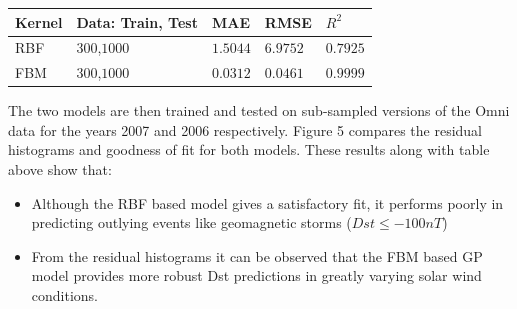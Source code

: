 \documentclass[portrait,a0b,final]{a0poster}
\newenvironment{poster}{
  \begin{center}
  \begin{minipage}[c]{0.85\textwidth}
}{
  \end{minipage} 
  \end{center}
}
\begin{document}
\begin{poster}
\begin{multicols}{2}
\setlength{\arrayrulewidth}{1mm}
\setlength{\tabcolsep}{18pt}
\renewcommand{\arraystretch}{2.5}
{
\begin{tabular}{ |p{5cm}|p{5cm}|p{5cm}|p{5cm}|p{5cm}|  }
\hline
Kernel & Data: Train, Test & MAE & RMSE & $R^2$\\
\hline
RBF  & $300$,$1000$ & $1.5044$ & $6.9752$ & $0.7925$ \\
FBM  & $300$,$1000$ & $0.0312$ & $0.0461$ & $0.9999$ \\
\hline
\end{tabular} 
}
\vspace{\baselineskip}

The two models are then trained and tested on sub-sampled versions of the Omni data for the years 2007 and 2006 respectively. Figure 5 compares the residual histograms and goodness of fit for both models. These results along with table above show that:
\begin{itemize}
    \item Although the RBF based model gives a satisfactory fit, it performs poorly in predicting outlying events like geomagnetic storms ($Dst \leq -100 nT$)
    \item From the residual histograms it can be observed that the FBM based GP model provides more robust Dst predictions in greatly varying solar wind conditions. 
\end{itemize}

\end{multicols}

\end{poster}
\end{document}
